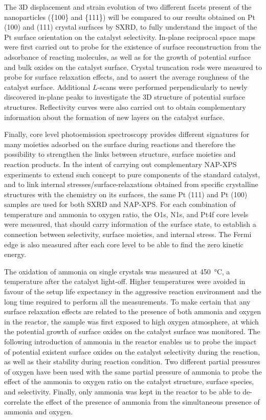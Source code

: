 The 3D displacement and strain evolution of two different facets present of the nanoparticles (\{100\} and \{111\}) will be compared to our results obtained on Pt (100) and (111) crystal surfaces by SXRD, to fully understand the impact of the Pt surface orientation on the catalyst selectivity.
In-plane reciprocal space maps were first carried out to probe for the existence of surface reconstruction from the adsorbance of reacting molecules, as well as for the growth of potential surface and bulk oxides on the catalyst surface.
Crystal truncation rods were measured to probe for surface relaxation effects, and to assert the average roughness of the catalyst surface.
Additional $L$-scans were performed perpendicularly to newly discovered in-plane peaks to investigate the 3D structure of potential surface structures.
Reflectivity curves were also carried out to obtain complementary information about the formation of new layers on the catalyst surface.

Finally, core level photoemission spectroscopy provides different signatures for many moieties adsorbed on the surface during reactions and therefore the possibility to strengthen the links between structure, surface moieties and reaction products.
In the intent of carrying out complementary NAP-XPS experiments to extend such concept to pure components of the standard catalyst, and to link internal stresses/surface-relaxations obtained from specific crystalline structures with the chemistry on its surfaces, the same Pt (111) and Pt (100) samples are used for both SXRD and NAP-XPS.
For each combination of temperature and ammonia to oxygen ratio, the O1s, N1s, and Pt4f core levels were measured, that should carry information of the surface state, to establish a connection between selectivity, surface moieties, and internal stress.
The Fermi edge is also measured after each core level to be able to find the zero kinetic energy.

The oxidation of ammonia on single crystals was measured at \qty{450}{\degreeCelsius}, a temperature after the catalyst light-off.
Higher temperatures were avoided in favour of the setup life expectancy in the aggressive reaction environment and the long time required to perform all the measurements.
To make certain that any surface relaxation effects are related to the presence of both ammonia and oxygen in the reactor, the sample was first exposed to high oxygen atmosphere, at which the potential growth of surface oxides on the catalyst surface was monitored.
The following introduction of ammonia in the reactor enables us to probe the impact of potential existent surface oxides on the catalyst selectivity during the reaction, as well as their stability during reaction condition.
Two different partial pressures of oxygen have been used with the same partial pressure of ammonia to probe the effect of the ammonia to oxygen ratio on the catalyst structure, surface species, and selectivity.
Finally, only ammonia was kept in the reactor to be able to de-correlate the effect of the presence of ammonia from the simultaneous presence of ammonia and oxygen.

